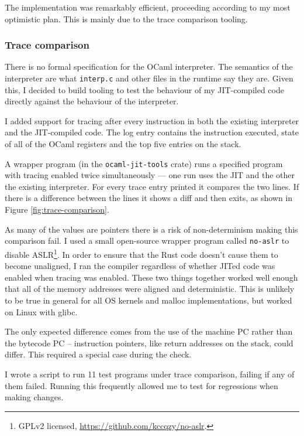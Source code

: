 The implementation was remarkably efficient, proceeding according to my most optimistic plan. This
is mainly due to the trace comparison tooling.

\subsubsection{Trace comparison} \label{trace-comparison}

There is no formal specification for the OCaml interpreter. The semantics of the interpreter are
what
\texttt{interp.c} and other files in the runtime say they are. Given this, I decided to build
tooling to test the behaviour of my JIT-compiled code directly against the behaviour of the
interpreter.

I added support for tracing after every instruction in both the existing interpreter and the
JIT-compiled code. The log entry contains the instruction executed, state of all of the OCaml
registers and the top five entries on the stack.

A wrapper program (in the \texttt{ocaml-jit-tools} crate) runs a specified program with tracing
enabled twice simultaneously --- one run uses the JIT and the other the existing interpreter.  For
every trace entry printed it compares the two lines. If there is a difference between the lines it
shows a diff and then exits, as shown in Figure \ref{fig:trace-comparison}.

As many of the values are pointers there is a risk of non-determinism making this comparison fail.
I used a small open-source wrapper program called \texttt{no-aslr} to disable ASLR\footnote{GPLv2
      licensed, \url{https://github.com/kccqzy/no-aslr}.}. In order to ensure
that the Rust code doesn't cause them to become unaligned, I ran the compiler regardless of whether
JITed code was enabled when tracing was enabled. These two things together worked well enough that
all of the memory addresses were aligned and deterministic. This is unlikely to be true in general
for all OS kernels and malloc implementations, but worked on Linux with glibc.

The only expected difference comes from the use of the machine PC rather than the bytecode PC --
instruction pointers, like return addresses on the stack, could differ. This required a special
case during the check.

I wrote a script to run 11 test programs under trace comparison, failing if any of them failed.
Running this frequently allowed me to test for regressions when making changes.


